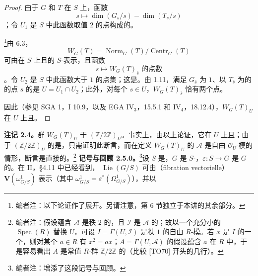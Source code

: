 \begin{proof}
由于 $G$ 和 $T$ 在 $S$ 上，函数
\[
s\longmapsto\dim(G_s/s)-\dim(T_s/s)
\]
；令 $U_1$ 是 $S$ 中此函数取值 $2$ 的点构成的。

\footnote[16]{编者注：以下论证作了展开。另请注意，第 6 节独立于本讲的其余部分。}由 6.3，
\[
W_G(T)=\operatorname{Norm}_G(T)/\operatorname{Centr}_G(T)
\]
可由在 $S$ 上且的 $S$-表示，且函数
\[
s\longmapsto W_G(T)_{\bar s}\text{ 的点数}
\]
。令 $U_2$ 是 $S$ 中此函数大于 $1$ 的点集；这是。由 1.11，满足 $G_{\bar s}$ 为 $1$、以 $T_{\bar s}$ 为的的点 $s$ 的是 $U=U_1\cap U_2$；此外，对每个 $s\in U$，$W_G(T)_{\bar s}$ 恰有两个点。

因此（参见 SGA 1，I 10.9，以及 EGA IV$_3$，15.5.1 和 IV$_4$，18.12.4），$W_G(T)_U$ 在 $U$ 上且。
\end{proof}
\textbf{注记 2.4。}群 $W_G(T)_U$ 于 $(\mathbb Z/2\mathbb Z)_U$。事实上，由以上论证，它在 $U$ 上且；由于 $(\mathbb Z/2\mathbb Z)_U$ 的是，只需证明此断言，而在定义 $W_G(T)_U$ 的 $\mathscr A$ 是自由 $\mathscr O_U$-模的情形，断言是直接的。\footnote[17]{编者注：假设蕴含 $\mathscr A$ 是秩 $2$ 的，且 $\mathscr I$ 是 $\mathscr A$ 的；故以一个充分小的 $\operatorname{Spec}(R)$ 替换 $U$，可设 $I=\Gamma(U,\mathscr I)$ 是秩 $1$ 的自由 $R$-模。若 $x$ 是 $I$ 的一个，则对某个 $a\in R$ 有 $x^2=ax$；$A=\Gamma(U,\mathscr A)$ 的假设蕴含 $a$ 在 $R$ 中，于是容易看出 $A$ 是常值 $R$-群 $\mathbb Z/2\mathbb Z$ 的（比较 [TO70] 开头的几行）。}
\textbf{记号与回顾 2.5.0。}\footnote[18]{编者注：增添了这段记号与回顾。}设 $S$ 是，$G$ 是 $S$-，$\varepsilon:S\to G$ 是 $G$ 的。在 II，\S 4.11 中已经看到， $\operatorname{Lie}(G/S)$ 可由（fibration vectorielle） $\mathbf V(\omega^1_{G/S})$ 表示（其中 $\omega^1_{G/S}=\varepsilon^*(\Omega^1_{G/S})$），并以
